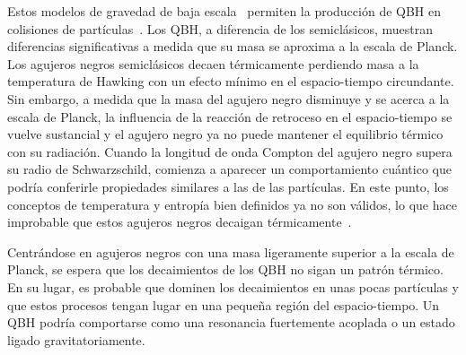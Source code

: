 Estos modelos de gravedad de baja escala~\cite{Antoniadis_Arkani_Dimopoulos_Dvali-1998,ADD-1998,RS1-1999_1,RS1-1999_2,Dvali-2008,Dvali-2010} permiten la producción de \ac{QBH} en colisiones de partículas~\cite{Argyres-1998,Banks-1999,Giddings-2002}.
Los \ac{QBH}, a diferencia de los semiclásicos, muestran diferencias significativas a medida que su masa se aproxima a la escala de Planck. Los agujeros negros semiclásicos decaen térmicamente perdiendo masa a la temperatura de Hawking con un efecto mínimo en el espacio-tiempo circundante. Sin embargo, a medida que la masa del agujero negro disminuye y se acerca a la escala de Planck, la influencia de la reacción de retroceso en el espacio-tiempo se vuelve sustancial y el agujero negro ya no puede mantener el equilibrio térmico con su radiación. Cuando la longitud de onda Compton del agujero negro supera su radio de Schwarzschild, comienza a aparecer un comportamiento cuántico que podría conferirle propiedades similares a las de las partículas. En este punto, los conceptos de temperatura y entropía bien definidos ya no son válidos, lo que hace improbable que estos agujeros negros decaigan térmicamente~\cite{Meade-2008,Alberghi-2006,Alberghi-2007}.

Centrándose en agujeros negros con una masa ligeramente superior a la escala de Planck, se espera que los decaimientos de los \ac{QBH} no sigan un patrón térmico. En su lugar, es probable que dominen los decaimientos en unas pocas partículas y que estos procesos tengan lugar en una pequeña región del espacio-tiempo. Un \ac{QBH} podría comportarse como una resonancia fuertemente acoplada o un estado ligado gravitatoriamente.

